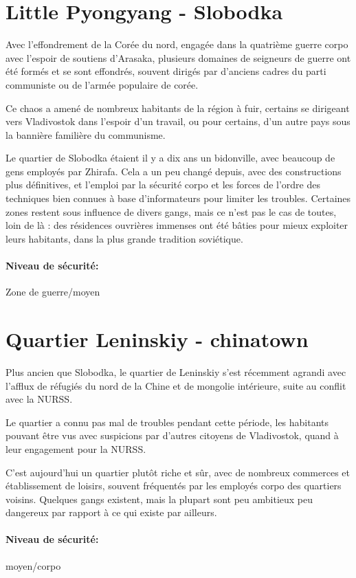 \documentclass[10pt,a4paper]{book}
\begin{document}
\section{Little Pyongyang - Slobodka}
Avec l'effondrement de la Corée du nord, engagée dans la quatrième guerre corpo avec l'espoir de soutiens d'Arasaka, plusieurs domaines de seigneurs de guerre ont été formés et se sont effondrés, souvent dirigés par d'anciens cadres du parti communiste ou de l'armée populaire de corée.

Ce chaos a amené de nombreux habitants de la région à fuir, certains se dirigeant vers Vladivostok dans l'espoir d'un travail, ou pour certains, d'un autre pays sous la bannière familière du communisme.

Le quartier de Slobodka étaient il y a dix ans un bidonville, avec beaucoup de gens employés par Zhirafa. Cela a un peu changé depuis, avec des constructions plus définitives,  et l'emploi par la sécurité corpo et les forces de l'ordre des techniques bien connues à base d'informateurs pour limiter les troubles. Certaines zones restent sous influence de divers gangs, mais ce n'est pas le cas de toutes, loin de là : des résidences ouvrières immenses ont été bâties pour mieux exploiter leurs habitants, dans la plus grande tradition soviétique.
\paragraph{Niveau de sécurité:}Zone de guerre/moyen
\section{Quartier Leninskiy - chinatown}
Plus ancien que Slobodka, le quartier de Leninskiy s'est récemment agrandi avec l'afflux de réfugiés du nord de la Chine et de mongolie intérieure, suite au conflit avec la NURSS. 

Le quartier a connu pas mal de troubles pendant cette période, les habitants pouvant être vus avec suspicions par d'autres citoyens de Vladivostok, quand à leur engagement pour la NURSS.

C'est aujourd'hui un quartier plutôt riche et sûr, avec de nombreux commerces et établissement de loisirs, souvent fréquentés par les employés corpo des quartiers voisins. Quelques gangs existent, mais la plupart sont peu ambitieux peu dangereux par rapport à ce qui existe par ailleurs.
\paragraph{Niveau de sécurité:}moyen/corpo
\end{document}
